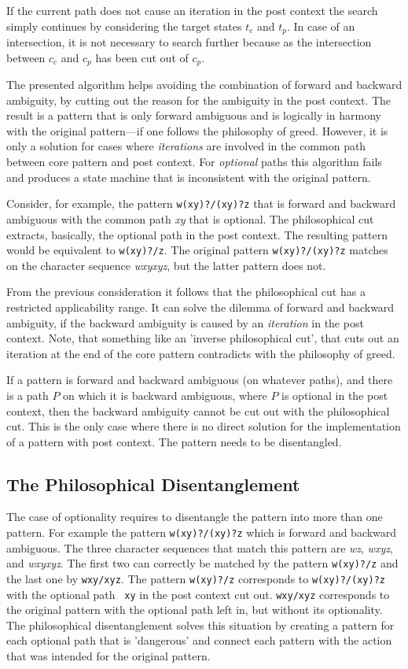 If the current path does not cause an iteration in the post context the
search simply continues by considering the target states $t_c$ and
$t_p$. In case of an intersection, it is not necessary to search further
because as the intersection between $c_c$ and $c_p$ has been cut out
of $c_p$.

The presented algorithm helps avoiding the combination of forward
and backward ambiguity, by cutting out the reason for the ambiguity
in the post context. The result is a pattern that is only forward
ambiguous and is logically in harmony with the original pattern---if
one follows the philosophy of greed. However, it is only a solution 
for cases where {\it iterations} are involved in the common path between
core pattern and post context. For {\it optional} paths this algorithm
fails and produces a state machine that is inconsistent with the 
original pattern.

Consider, for example, the pattern {\tt w(xy)?/(xy)?z} that is
forward and backward ambiguous with the common path {\it xy} that
is optional. The philosophical cut extracts, basically, the optional
path in the post context. The resulting pattern would be equivalent
to {\tt w(xy)?/z}. The original pattern {\tt w(xy)?/(xy)?z} matches
on the character sequence {\it wxyxyz}, but the latter pattern does not.

From the previous consideration it follows that the philosophical cut has a
restricted applicability range.  It can solve the dilemma of forward and
backward ambiguity, if the backward ambiguity is caused by an {\it iteration}
in the post context. Note, that something like an 'inverse philosophical
cut', that cuts out an iteration at the end of the core pattern
contradicts with the philosophy of greed.

If a pattern is forward and backward ambiguous (on whatever paths), and there is 
a path $P$ on which it is backward ambiguous, where $P$ is optional in the post context, then the
backward ambiguity cannot be cut out with the philosophical cut. This is the
only case where there is no direct solution for the implementation of a pattern
with post context.  The pattern needs to be disentangled.

\subsection{The Philosophical Disentanglement}

The case of optionality requires to disentangle the pattern into more than one
pattern. For example the pattern {\tt w(xy)?/(xy)?z} which is forward and
backward ambiguous. The three character sequences that match this pattern are
{\it wz}, {\it wxyz}, and {\it wxyxyz}. The first two can correctly be matched
by the pattern {\tt w(xy)?/z} and the last one by {\tt wxy/xyz}.  The pattern
{\tt w(xy)?/z} corresponds to {\tt w(xy)?/(xy)?z} with the optional path {\tt
    xy} in the post context cut out. {\tt wxy/xyz} corresponds to the original
    pattern with the optional path left in, but without its optionality. The philosophical 
    disentanglement solves this situation by
    creating a pattern for each optional path that is 'dangerous' and connect
    each pattern with the action that was intended for the original pattern.


